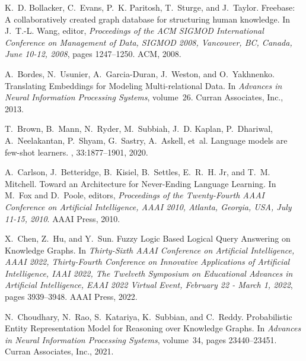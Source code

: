 \documentclass[11pt]{article}
\begin{document}
\begin{thebibliography}{10}
\begin{small}
K.~D. Bollacker, C.~Evans, P.~K. Paritosh, T.~Sturge, and J.~Taylor.
\newblock Freebase: A collaboratively created graph database for structuring
human knowledge.
\newblock In J.~T.-L. Wang, editor, {\em Proceedings of the {{ACM SIGMOD
			International Conference}} on {{Management}} of {{Data}}, {{SIGMOD}} 2008,
	{{Vancouver}}, {{BC}}, {{Canada}}, {{June}} 10-12, 2008}, pages 1247--1250.
{ACM}, 2008.

A.~Bordes, N.~Usunier, A.~{Garcia-Duran}, J.~Weston, and O.~Yakhnenko.
\newblock Translating {{Embeddings}} for {{Modeling Multi-relational Data}}.
\newblock In {\em Advances in {{Neural Information Processing Systems}}},
volume~26. {Curran Associates, Inc.}, 2013.

T.~Brown, B.~Mann, N.~Ryder, M.~Subbiah, J.~D. Kaplan, P.~Dhariwal,
A.~Neelakantan, P.~Shyam, G.~Sastry, A.~Askell, et~al.
\newblock Language models are few-shot learners.
,
33:1877--1901, 2020.

A.~Carlson, J.~Betteridge, B.~Kisiel, B.~Settles, E.~R.~H. Jr, and T.~M.
Mitchell.
\newblock Toward an {{Architecture}} for {{Never-Ending Language Learning}}.
\newblock In M.~Fox and D.~Poole, editors, {\em Proceedings of the
	{{Twenty-Fourth AAAI Conference}} on {{Artificial Intelligence}}, {{AAAI}}
	2010, {{Atlanta}}, {{Georgia}}, {{USA}}, {{July}} 11-15, 2010}. {AAAI Press},
2010.

X.~Chen, Z.~Hu, and Y.~Sun.
\newblock Fuzzy {{Logic Based Logical Query Answering}} on {{Knowledge
		Graphs}}.
\newblock In {\em Thirty-{{Sixth AAAI Conference}} on {{Artificial
			Intelligence}}, {{AAAI}} 2022, {{Thirty-Fourth Conference}} on {{Innovative
			Applications}} of {{Artificial Intelligence}}, {{IAAI}} 2022, {{The Twelveth
			Symposium}} on {{Educational Advances}} in {{Artificial Intelligence}},
	{{EAAI}} 2022 {{Virtual Event}}, {{February}} 22 - {{March}} 1, 2022}, pages
3939--3948. {AAAI Press}, 2022.

N.~Choudhary, N.~Rao, S.~Katariya, K.~Subbian, and C.~Reddy.
\newblock Probabilistic {{Entity Representation Model}} for {{Reasoning}} over
{{Knowledge Graphs}}.
\newblock In {\em Advances in {{Neural Information Processing Systems}}},
volume~34, pages 23440--23451. {Curran Associates, Inc.}, 2021.


\end{small}
\end{thebibliography}
\end{document}
